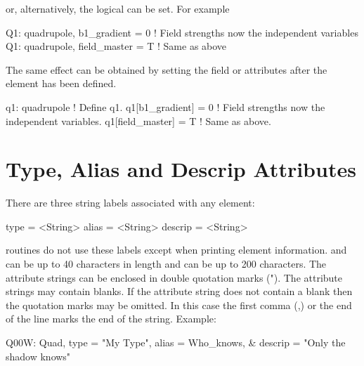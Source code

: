 or, alternatively, the  logical can be set. For
example
\begin{example}
  Q1: quadrupole, b1_gradient = 0   ! Field strengths now the independent variables
  Q1: quadrupole, field_master = T  ! Same as above
\end{example}
The same effect can be obtained by setting the field or  attributes
after the element has been defined.
\begin{example}
  q1: quadrupole        ! Define q1.
  q1[b1_gradient] = 0   ! Field strengths now the independent variables.
  q1[field_master] = T  ! Same as above.
\end{example}

\section{Type, Alias and Descrip Attributes}
\label{s:alias}

There are three string labels associated with any element:
\begin{example}
  type    = <String>
  alias   = <String>
  descrip = <String>
\end{example}
\bmad routines do not use these labels except when printing element
information.  and  can be up to 40 characters in
length and  can be up to 200 characters. The attribute
strings can be enclosed in double quotation marks ("). The attribute
strings may contain blanks. If the attribute string does not contain a
blank then the quotation marks may be omitted. In this case the first
comma (,) or the end of the line marks the end of the string. Example:
\begin{example}
  Q00W: Quad, type = "My Type", alias = Who_knows, &
                                  descrip = "Only the shadow knows"
\end{example}

